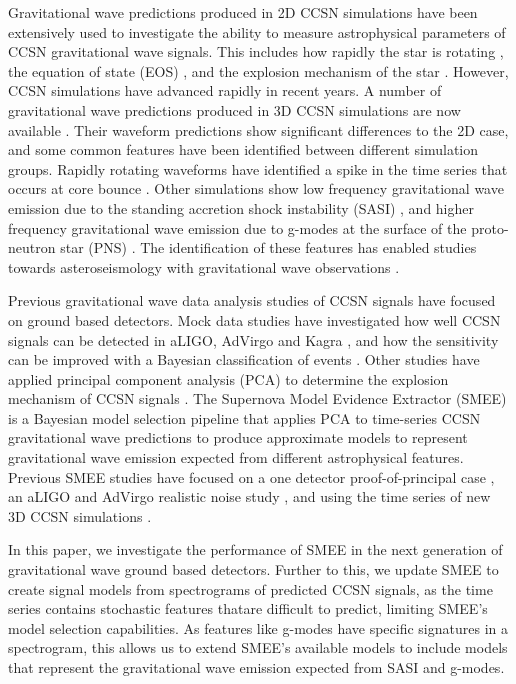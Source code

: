 \documentclass[letterpaper, aps, prd, twocolumn, superscriptaddress, showpacs, nofootinbib]{revtex4}
\begin{document}
Gravitational wave predictions produced in 2D CCSN simulations have been extensively used to investigate the ability to measure astrophysical parameters of CCSN gravitational wave signals. This includes how rapidly the star is rotating \cite{2014PhRvD..90d4001A}, the equation of state (EOS) \cite{2017PhRvD..95f3019R}, and the explosion mechanism of the star \cite{logue:12, powell:16b}. However, CCSN simulations have advanced rapidly in recent years. A number of gravitational wave predictions produced in 3D CCSN simulations are now available \cite{mueller:e12, scheidegger:10b, kuroda:16, andresen:16, 2017arXiv170107325Y, 2018arXiv181007638A}. Their waveform predictions show significant differences to the 2D case, and some common features have been identified between different simulation groups. Rapidly rotating waveforms have identified a spike in the time series that occurs at core bounce \cite{scheidegger:10b}. Other simulations show low frequency gravitational wave emission due to the standing accretion shock instability (SASI) \cite{2015PhRvD..92h4040Y, 2013ApJ...766...43M}, and higher frequency gravitational wave emission due to g-modes at the surface of the proto-neutron star (PNS) \cite{2013ApJ...766...43M}. The identification of these features has enabled studies towards asteroseismology with gravitational wave observations \cite{2018MNRAS.474.5272T, 2018arXiv180611366T}. 

Previous gravitational wave data analysis studies of CCSN signals have focused on ground based detectors. Mock data studies have investigated how well CCSN signals can be detected in aLIGO, AdVirgo and Kagra \cite{2015PhRvD..92l2001H, 2016PhRvD..93d2002G}, and how the sensitivity can be improved with a Bayesian classification of events \cite{2018arXiv180207255G}. Other studies have applied principal component analysis (PCA) to determine the explosion mechanism of CCSN signals \cite{heng:09, 2014InvPr..30k4008E, logue:12, powell:16b, 2017PhRvD..96l3013P}. The Supernova Model Evidence Extractor (SMEE) is a Bayesian model selection pipeline that applies PCA to time-series CCSN gravitational wave predictions to produce approximate models to represent gravitational wave emission expected from different astrophysical features. Previous SMEE studies have focused on a one detector proof-of-principal case \cite{logue:12}, an aLIGO and AdVirgo realistic noise study \cite{powell:16b}, and using the time series of new 3D CCSN simulations \cite{2017PhRvD..96l3013P}. 

In this paper, we investigate the performance of SMEE in the next generation of gravitational wave ground based detectors. Further to this, we update SMEE to create signal models from spectrograms of predicted CCSN signals, as the time series contains stochastic features thatare difficult to predict, limiting SMEE's model selection capabilities. As features like g-modes have specific signatures in a spectrogram, this allows us to extend SMEE's available models to include models that represent the gravitational wave emission expected from SASI and g-modes.   
\end{document}
